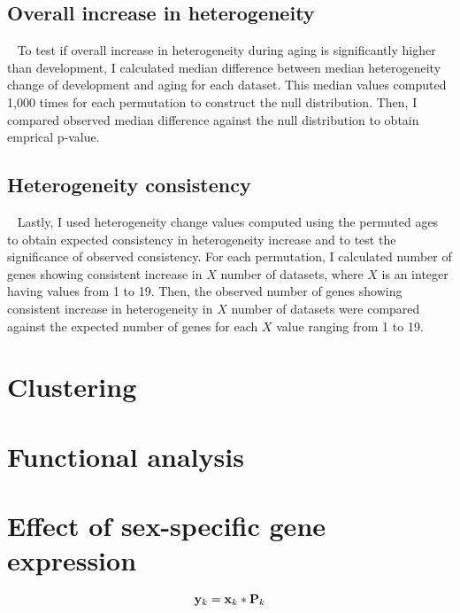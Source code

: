 \subsection{Overall increase in heterogeneity}~\label{subsec:perm.overall}
To test if overall increase in heterogeneity during aging is significantly higher than development, 
I calculated median difference between median heterogeneity change of development and aging for each dataset.
This median values computed 1,000 times for each permutation to construct the null distribution.
Then, I compared observed median difference against the null distribution to obtain emprical p-value.

\subsection{Heterogeneity consistency}~\label{subsec:perm.consist}
Lastly, I used heterogeneity change values computed using the permuted ages to obtain expected consistency in heterogeneity increase and to test the significance of observed consistency.
For each permutation, I calculated number of genes showing consistent increase in $X$ number of datasets, where $X$ is an integer having values from 1 to 19.
Then, the observed number of genes showing consistent increase in heterogeneity in $X$ number of datasets were compared against the expected number of genes for
each $X$ value ranging from 1 to 19.

\section{Clustering}

\section{Functional analysis}

\section{Effect of sex-specific gene expression}



\begin{equation}
{\bf y}_k = {\bf x}_k * {\bf P}_k
\end{equation}

























